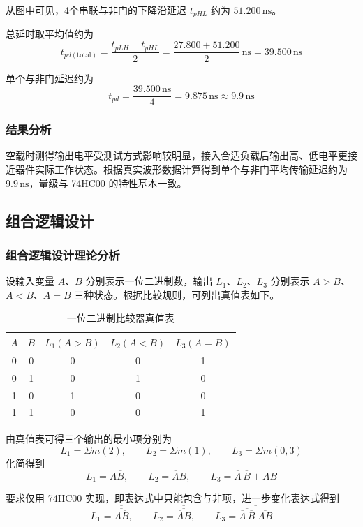 \documentclass[a4paper,12pt]{article}
\begin{document}
从图中可见，4个串联与非门的下降沿延迟 $t_{pHL}$ 约为 $51.200\,\text{ns}$。

总延时取平均值约为
\[
 t_{pd(\text{total})}=\frac{t_{pLH}+t_{pHL}}{2}
 =\frac{27.800+51.200}{2}\,\text{ns}
 =39.500\,\text{ns}
\]

单个与非门延迟约为
\[
 t_{pd}=\frac{39.500\,\text{ns}}{4}=9.875\,\text{ns}\approx 9.9\,\text{ns}
\]

\subsubsection{结果分析}
空载时测得输出电平受测试方式影响较明显，接入合适负载后输出高、低电平更接近器件实际工作状态。根据真实波形数据计算得到单个与非门平均传输延迟约为 $9.9\,\text{ns}$，量级与 74HC00 的特性基本一致。

\subsection{组合逻辑设计}
\subsubsection{组合逻辑设计理论分析}
设输入变量 $A$、$B$ 分别表示一位二进制数，输出 $L_1$、$L_2$、$L_3$ 分别表示 $A>B$、$A<B$、$A=B$ 三种状态。根据比较规则，可列出真值表如下。

\begin{table}[H]
\centering
\caption{一位二进制比较器真值表}
\renewcommand{\arraystretch}{1.4}
\begin{tabular}{|c|c|c|c|c|}
\hline
$A$ & $B$ & $L_1(A>B)$ & $L_2(A<B)$ & $L_3(A=B)$ \\
\hline
0 & 0 & 0 & 0 & 1 \\
\hline
0 & 1 & 0 & 1 & 0 \\
\hline
1 & 0 & 1 & 0 & 0 \\
\hline
1 & 1 & 0 & 0 & 1 \\
\hline
\end{tabular}
\end{table}

由真值表可得三个输出的最小项分别为
\[
L_1=\Sigma m(2),\qquad L_2=\Sigma m(1),\qquad L_3=\Sigma m(0,3)
\]
化简得到
\[
L_1=A\overline{B},\qquad L_2=\overline{A}B,\qquad L_3=\overline{A}\,\overline{B}+AB
\]

要求仅用 74HC00 实现，即表达式中只能包含与非项，进一步变化表达式得到
\[
L_1=\overline{\overline{A\overline{B}}},\qquad
L_2=\overline{\overline{\overline{A}B}},\qquad
L_3=\overline{\overline{\overline{A}\,\overline{B}}\;\overline{AB}}
\]
\end{document}
